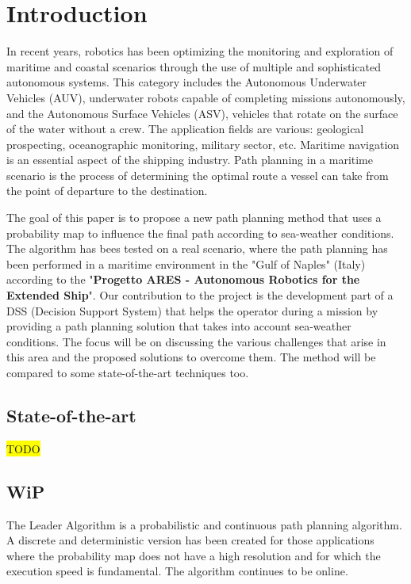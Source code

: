 \documentclass[journal,article,submit,pdftex,moreauthors]{Definitions/mdpi}
\begin{document}

\section{Introduction}
In recent years, robotics has been optimizing the monitoring and exploration of maritime and coastal scenarios through the use of multiple and sophisticated autonomous systems. 
This category includes the Autonomous Underwater Vehicles (AUV), underwater robots capable of completing missions autonomously, and the Autonomous Surface Vehicles (ASV), vehicles that rotate on the surface of the water without a crew. The application fields are various: geological prospecting, oceanographic monitoring, military sector, etc. 
Maritime navigation is an essential aspect of the shipping industry. Path planning in a maritime scenario is the process of determining the optimal route a vessel can take from the point of departure to the destination. 

The goal of this paper is to propose a new path planning method that uses a probability map to influence the final path according to sea-weather conditions.
The algorithm has bees tested on a real scenario, where the path planning has been performed in a maritime environment in the "Gulf of Naples" (Italy) according to 
the "\textbf{Progetto ARES - Autonomous Robotics for the Extended Ship}".
Our contribution to the project is the development part of a DSS (Decision Support System) that helps the operator during a mission by providing a path planning solution 
that takes into account sea-weather conditions.
The focus will be on discussing the various challenges that arise in this area and the proposed solutions to overcome them. 
The method will be compared to some state-of-the-art techniques too.


\subsection{State-of-the-art}
\colorbox{yellow}{TODO}

\subsection{WiP}
The Leader Algorithm is a probabilistic and continuous path planning algorithm. A discrete and deterministic version has been created for those applications where the probability map does not have a high resolution and for which the execution speed is fundamental. The algorithm continues to be online.
\end{document}
